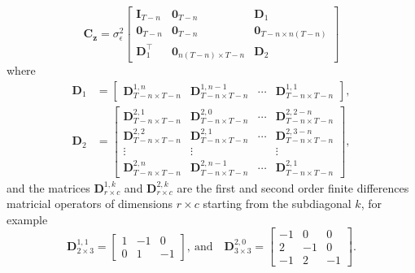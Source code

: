 \begin{equation} \mathbf{C}_{\mathbf{z}} = \sigma_{\epsilon}^2 \begin{bmatrix} \mathbf{I}_{T-n} & \mathbf{0}_{T-n} & \mathbf{D}_1 \\ \mathbf{0}_{T-n} & \mathbf{0}_{T-n} & \mathbf{0}_{T-n \times n \left( T-n \right)}  \\  \mathbf{D}_1^\top & \mathbf{0}_{n \left( T-n \right) \times T-n} & \mathbf{D}_2  \end{bmatrix}  \label{eqn:Cz} \end{equation} 
where
\begin{equation*} \begin{aligned} \mathbf{D}_1 &= \begin{bmatrix}\mathbf{D}_{T-n \times T-n}^{1,n} & \mathbf{D}_{T-n \times T-n}^{1,n-1} & \cdots  & \mathbf{D}_{T-n \times T-n}^{1,1}\end{bmatrix}, \\ 
 \mathbf{D}_2 &= \begin{bmatrix} \mathbf{D}_{T-n \times T-n}^{2,1} & \mathbf{D}_{T-n \times T-n}^{2,0} & \cdots & \mathbf{D}_{T-n \times T-n}^{2,2-n} \\ \mathbf{D}_{T-n \times T-n}^{2,2} & \mathbf{D}_{T-n \times T-n}^{2,1} & \cdots & \mathbf{D}_{T-n \times T-n}^{2,3-n} \\ \vdots & \vdots & & \vdots \\ \mathbf{D}_{T-n \times T-n}^{2,n} & \mathbf{D}_{T-n \times T-n}^{2,n-1} & \cdots & \mathbf{D}_{T-n \times T-n}^{2,1} \end{bmatrix} , \end{aligned}  \end{equation*} 
and the matrices
$\mathbf{D}_{r \times c}^{1,k}$ and $\mathbf{D}_{r \times c}^{2,k}$  are the first and second order finite differences matricial operators of dimensions $r \times c$  starting from the subdiagonal $k$, for example \begin{equation*} 
\mathbf{D}_{2 \times 3}^{1,1} = \begin{bmatrix} 1 & -1 & 0 \\ 0 & 1 & -1 \end{bmatrix}, \ \mathrm{and} \quad \mathbf{D}_{3 \times 3}^{2,0} = \begin{bmatrix}-1 & 0 & 0 \\ 2 & -1 & 0 \\ - 1 & 2 & -1  \end{bmatrix} . \end{equation*}
 
